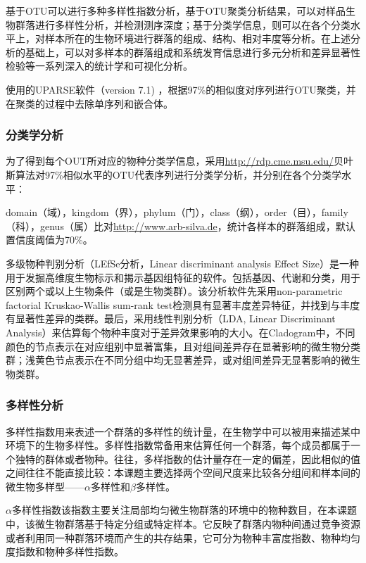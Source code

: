     基于OTU可以进行多种多样性指数分析，基于OTU聚类分析结果，可以对样品生物群落进行多样性分析，并检测测序深度；基于分类学信息，则可以在各个分类水平上，对样本所在的生物环境进行群落的组成、结构、相对丰度等分析。在上述分析的基础上，可以对多样本的群落组成和系统发育信息进行多元分析和差异显著性检验等一系列深入的统计学和可视化分析。

    使用的UPARSE软件（version 7.1) ，根据97\%的相似度对序列进行OTU聚类，并在聚类的过程中去除单序列和嵌合体。
    \subsubsection{分类学分析}
    为了得到每个OUT所对应的物种分类学信息，采用\href{RDP classifier}{http://rdp.cme.msu.edu/}贝叶斯算法对97\%相似水平的OTU代表序列进行分类学分析，并分别在各个分类学水平：

    domain（域），kingdom（界），phylum（门），class（纲），order（目），family（科），genus（属）比对\href{Silva数据库}{http://www.arb-silva.de}，统计各样本的群落组成，默认置信度阈值为70\%。

    多级物种判别分析（LEfSe分析，Linear discriminant analysis Effect Size）是一种用于发掘高维度生物标示和揭示基因组特征的软件。包括基因、代谢和分类，用于区别两个或以上生物条件（或是生物类群）。该分析软件先采用non-parametric factorial Kruskao-Wallis sum-rank test检测具有显著丰度差异特征，并找到与丰度有显著性差异的类群。最后，采用线性判别分析（LDA, Linear Discriminant Analysis）来估算每个物种丰度对于差异效果影响的大小。在Cladogram中，不同颜色的节点表示在对应组别中显著富集，且对组间差异存在显著影响的微生物分类群；浅黄色节点表示在不同分组中均无显著差异，或对组间差异无显著影响的微生物类群。

    \subsubsection{多样性分析}
    多样性指数用来表述一个群落的多样性的统计量，在生物学中可以被用来描述某中环境下的生物多样性。多样性指数常备用来估算任何一个群落，每个成员都属于一个独特的群体或者物种。往往，多样指数的估计量存在一定的偏差，因此相似的值之间往往不能直接比较：本课题主要选择两个空间尺度来比较各分组间和样本间的微生物多样型——$\alpha$多样性和$\beta$多样性。

    $\alpha$多样性指数该指数主要关注局部均匀微生物群落的环境中的物种数目，在本课题中，该微生物群落基于特定分组或特定样本。它反映了群落内物种间通过竞争资源或者利用同一种群落环境而产生的共存结果，它可分为物种丰富度指数、物种均匀度指数和物种多样性指数。

